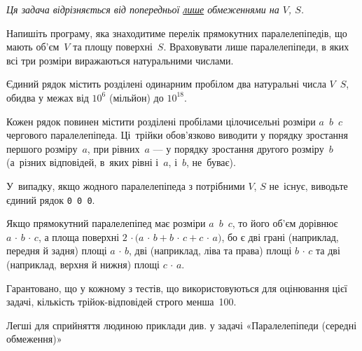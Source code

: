 ﻿{\it Ця задача відрізняється від попередньої \underline{лише} обмеженнями на $V$, $S$.}

Напишіть програму, яка знаходитиме перелік прямокутних паралелепіпедів, що мають об'єм~$V$ та площу поверхні~$S$. Враховувати лише паралелепіпеди, в яких всі три розміри виражаються натуральними числами.

\InputFile
Єдиний рядок містить розділені одинарним пробілом два натуральні числа $V$~$S$, обидва у межах від $10^6$ (мільйон) до $10^{18}$.

\OutputFile
Кожен рядок повинен містити розділені пробілами цілочисельні розміри $a$~$b$~$c$ чергового паралелепіпеда. Ці~трійки обов'язково виводити у порядку зростання першого розміру~$a$, при рівних~$a$ --- у порядку зростання др{\it у}гого розміру~$b$ (а~різних відповідей, в~яких рівні і~$a$, і~$b$, не~буває). 

У~випадку, якщо жодного паралелепіпеда з потрібними $V$, $S$ не~існує, виводьте єдиний рядок \texttt{0~0~0}.

\Note
Якщо прямокутний паралелепіпед має розміри $a$~$b$~$c$, то його об'єм дорівнює ${a\,{\cdot}\,b\,{\cdot}\,c}$, а площа поверхні ${2\,{\cdot}\bigl(a\,{\cdot}\,b}+{b\,{\cdot}\,c}+{c\,{\cdot}\,a}\bigr)$, 
бо є 
дві грані (наприклад, передня й задня) площі ${a\,{\cdot}\,b}$, 
дві (наприклад, ліва та права) площі ${b\,{\cdot}\,c}$ 
та
дві (наприклад, верхня й нижня) площі ${c\,{\cdot}\,a}$.

Гарантовано, що у кожному з тестів, що використовуються для оцінювання цієї задачі, кількість трійок-відповідей строго менша~100.

\Examples
\begin{example}
%
\end{example}

\Note
Легші для сприйняття людиною приклади див. у задачі «Паралелепіпеди (середні обмеження)»